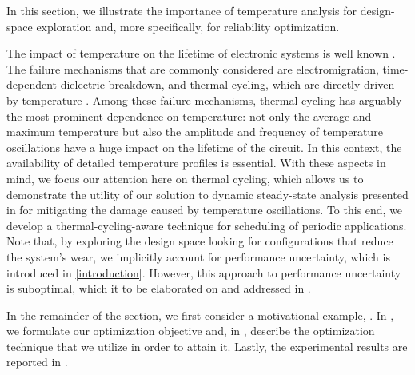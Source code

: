 In this section, we illustrate the importance of temperature analysis for
design-space exploration and, more specifically, for reliability optimization.

The impact of temperature on the lifetime of electronic systems is well known
\cite{srinivasan2004, coskun2006, xiang2010, jedec2016}. The failure mechanisms
that are commonly considered are electromigration, time-dependent dielectric
breakdown, and thermal cycling, which are directly driven by temperature
\cite{jedec2016}. Among these failure mechanisms, thermal cycling has arguably
the most prominent dependence on temperature: not only the average and maximum
temperature but also the amplitude and frequency of temperature oscillations
have a huge impact on the lifetime of the circuit. In this context, the
availability of detailed temperature profiles is essential. With these aspects
in mind, we focus our attention here on thermal cycling, which allows us to
demonstrate the utility of our solution to dynamic steady-state analysis
presented in  for mitigating the damage
caused by temperature oscillations. To this end, we develop a
thermal-cycling-aware technique for scheduling of periodic applications. Note
that, by exploring the design space looking for configurations that reduce the
system's wear, we implicitly account for performance uncertainty, which is
introduced in \cref{introduction}. However, this approach to performance
uncertainty is suboptimal, which it to be elaborated on and addressed in
.

In the remainder of the section, we first consider a motivational example,
. In , we formulate
our optimization objective and, in , describe the
optimization technique that we utilize in order to attain it. Lastly, the
experimental results are reported in .

\subsection{\exampletitle}

